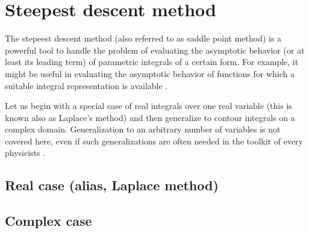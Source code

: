 \documentclass[onecolumn,a4paper,11pt]{article}
\providecommand{\eg}{e.\,g.}
\theoremstyle{classicdef}
\theoremstyle{remark}
\begin{document}
\section{Steepest descent method\label{app:saddle}}
The 
stepeest descent method (also referred to as saddle point method) is a powerful tool to handle the problem of
evaluating  the
  asymptotic behavior (or at least its leading term) of parametric integrals of a certain form.
For example, it might be useful in evaluating the asymptotic behavior of functions
 for which a suitable integral representation is available
 \autocites[An introductory discussion of these topics is given, \eg,
 by][\S~11]{King.Billingham.ea:2003}[or][\S~6.]{Ablowitz.Fokas:2003}[See
 also][\S~1]{Zinn-Justin:2002}.

Let us begin with a special case of real integrals over one real variable (this
is known also as Laplace's method) and then generalize to contour integrals on
a  complex domain. Generalization to an arbitrary number of variables is not
covered here, even if such generalizations are often needed in the toolkit of
every physicists%
\autocite[Stepeest  descent method  generalizes also to
functional
integrations and path integrals, this is very important in dealing with
non-perturbative corrections in quantum mechanics and quantum field
theory. Refer to, \eg, ][]{Zinn-Justin:2002}.
\subsection{Real case (alias, Laplace method)}
\subsection{Complex case}

\printbibliography
\end{document}
